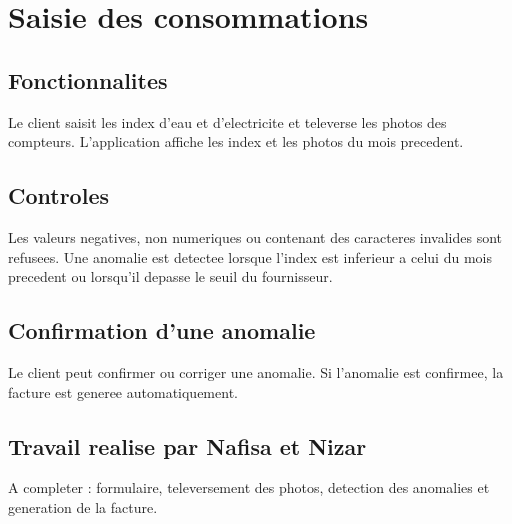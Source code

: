 \section{Saisie des consommations}

\subsection{Fonctionnalites}

Le client saisit les index d'eau et d'electricite et televerse les photos des compteurs. L'application affiche les index et les photos du mois precedent.

\subsection{Controles}

Les valeurs negatives, non numeriques ou contenant des caracteres invalides sont refusees. Une anomalie est detectee lorsque l'index est inferieur a celui du mois precedent ou lorsqu'il depasse le seuil du fournisseur.

\subsection{Confirmation d'une anomalie}

Le client peut confirmer ou corriger une anomalie. Si l'anomalie est confirmee, la facture est generee automatiquement.

\subsection{Travail realise par Nafisa et Nizar}

A completer : formulaire, televersement des photos, detection des anomalies et generation de la facture.
